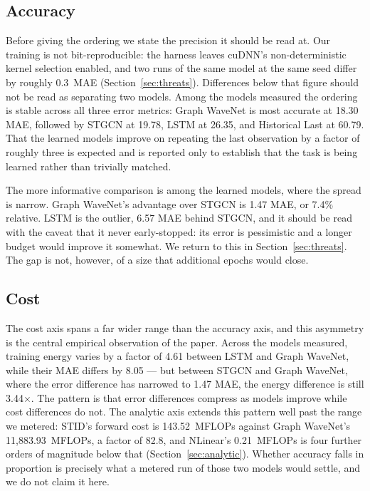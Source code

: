 \documentclass[manuscript,screen,review]{acmart}
\begin{document}
\subsection{Accuracy}
Before giving the ordering we state the precision it should be read at. Our
training is not bit-reproducible: the harness leaves cuDNN's non-deterministic
kernel selection enabled, and two runs of the same model at the same seed
differ by roughly $0.3$~MAE (Section~\ref{sec:threats}). Differences below
that figure should not be read as separating two models. Among the models
measured the ordering is stable
across all three error metrics: Graph WaveNet is most accurate at 18.30 MAE,
followed by STGCN at 19.78, LSTM at 26.35, and Historical Last at 60.79. That
the learned models improve on repeating the last observation by a factor of
roughly three is expected and is reported only to establish that the task is
being learned rather than trivially matched.

The more informative comparison is among the learned models, where the spread
is narrow. Graph WaveNet's advantage over STGCN is 1.47 MAE, or 7.4\% relative.
LSTM is the outlier, 6.57 MAE behind STGCN, and it should be read with the
caveat that it never early-stopped: its error is pessimistic and a longer
budget would improve it somewhat. We return to this in
Section~\ref{sec:threats}. The gap is not, however, of a size that additional
epochs would close.

\subsection{Cost}
The cost axis spans a far wider range than the accuracy axis, and this
asymmetry is the central empirical observation of the paper. Across the models
measured, training energy varies by a factor of 4.61 between LSTM and Graph
WaveNet, while their MAE differs by 8.05 --- but between STGCN and Graph
WaveNet, where the error difference has narrowed to 1.47 MAE, the energy
difference is still 3.44$\times$. The pattern is that error differences
compress as models improve while cost differences do not. The analytic axis
extends this pattern well past the range we metered: STID's forward cost is
143.52~MFLOPs against Graph WaveNet's 11{,}883.93~MFLOPs, a factor of 82.8,
and NLinear's 0.21~MFLOPs is four further orders of magnitude below that
(Section~\ref{sec:analytic}). Whether accuracy falls in proportion is precisely
what a metered run of those two models would settle, and we do not claim it
here.
\end{document}
